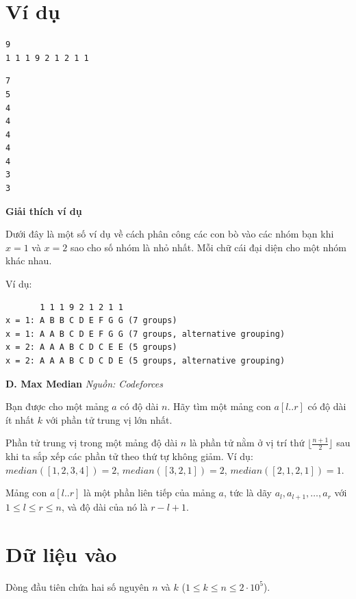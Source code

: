 \documentclass[12pt,a4paper]{article}
\newcommand{\problem}[2]{%
  \addcontentsline{toc}{section}{#1}%
  \begin{mdframed}[
    linecolor=framecolor,
    linewidth=1.5pt,
    backgroundcolor=white,
    topline=true, bottomline=true,
    leftline=true, rightline=true,
    innerleftmargin=10pt, innerrightmargin=10pt,
    innertopmargin=6pt, innerbottommargin=6pt,
  ]
  \textbf{\large #1} \hfill \textit{Nguồn: #2}
  \end{mdframed}
  \vspace{4pt}%
}
\newcommand{\explanation}{%
  \vspace{6pt}\textbf{\textcolor{sectioncolor}{Giải thích ví dụ}}\par\vspace{2pt}%
}
\begin{document}
\section*{Ví dụ}
\begin{inputbox}
\begin{lstlisting}
9
1 1 1 9 2 1 2 1 1
\end{lstlisting}
\end{inputbox}

\begin{outputbox}
\begin{lstlisting}
7
5
4
4
4
4
4
3
3
\end{lstlisting}
\end{outputbox}

\explanation
Dưới đây là một số ví dụ về cách phân công các con bò vào các nhóm bạn khi $x=1$ và $x=2$ sao cho số nhóm là nhỏ nhất. Mỗi chữ cái đại diện cho một nhóm khác nhau.

Ví dụ:
\begin{lstlisting}
       1 1 1 9 2 1 2 1 1
x = 1: A B B C D E F G G (7 groups)
x = 1: A A B C D E F G G (7 groups, alternative grouping)
x = 2: A A A B C D C E E (5 groups)
x = 2: A A A B C D C D E (5 groups, alternative grouping)
\end{lstlisting}


\newpage







\problem{D. Max Median}{Codeforces}

Bạn được cho một mảng $a$ có độ dài $n$. Hãy tìm một mảng con $a[l..r]$ có độ dài ít nhất $k$ với phần tử trung vị lớn nhất.

Phần tử trung vị trong một mảng độ dài $n$ là phần tử nằm ở vị trí thứ $\lfloor \frac{n + 1}{2} \rfloor$ sau khi ta sắp xếp các phần tử theo thứ tự không giảm. Ví dụ: $median([1, 2, 3, 4]) = 2$, $median([3, 2, 1]) = 2$, $median([2, 1, 2, 1]) = 1$.

Mảng con $a[l..r]$ là một phần liên tiếp của mảng $a$, tức là dãy $a_l, a_{l+1}, \ldots, a_r$ với $1 \leq l \leq r \leq n$, và độ dài của nó là $r - l + 1$.

\section*{Dữ liệu vào}
Dòng đầu tiên chứa hai số nguyên $n$ và $k$ ($1 \leq k \leq n \leq 2 \cdot 10^5$).
\end{document}
